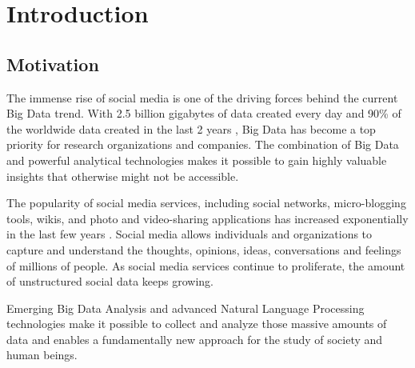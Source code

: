 
\chapter{Introduction}
\label{cha:introduction}

\section{Motivation}
\label{sec:motivation}
The immense rise of social media is one of the driving forces behind the current Big Data trend. With 2.5 billion gigabytes of data created every day and 90\% of the worldwide data created in the last 2 years \cite{ibm2012bigdata}, Big Data has become a top priority for research organizations and companies. The combination of Big Data and powerful analytical technologies makes it possible to gain highly valuable insights that otherwise might not be accessible.

The popularity of social media services, including social networks, micro-blogging tools, wikis, and photo and video-sharing applications has increased exponentially in the last few years \cite{cambria2013big}. Social media allows individuals and organizations to capture and understand the thoughts, opinions, ideas, conversations and feelings of millions of people. As social media services continue to proliferate, the amount of unstructured social data keeps growing.

Emerging Big Data Analysis and advanced Natural Language Processing technologies make it possible to collect and analyze those massive amounts of data and enables a fundamentally new approach for the study of society and human beings.

